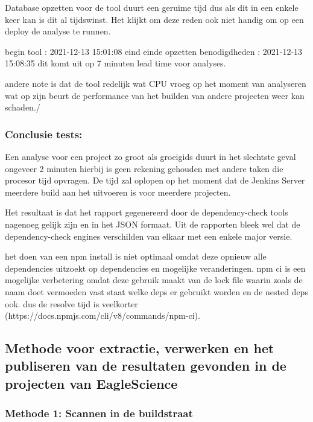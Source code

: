Database opzetten voor de tool duurt een geruime tijd dus als dit in een enkele keer kan is dit al tijdswinst. Het klijkt om deze reden ook niet handig om op een deploy de analyse te runnen.


begin tool : 2021-12-13 15:01:08
eind einde opzetten benodigdheden : 2021-12-13 15:08:35
dit komt uit op 7 minuten lead time voor analyses.

andere note is dat de tool redelijk wat CPU vroeg op het moment van analyseren wat op zijn beurt de performance van het builden van andere projecten weer kan schaden./




\subsubsection{Conclusie tests:}
Een analyse voor een project zo groot als groeigids duurt in het slechtste geval ongeveer 2 minuten hierbij is geen rekening gehouden met andere taken die procesor tijd opvragen. De tijd zal oplopen op het moment dat de Jenkins Server meerdere build aan het uitvoeren is voor meerdere projecten.



Het resultaat is dat het rapport gegenereerd door de dependency-check tools nagenoeg gelijk zijn en in het JSON formaat. Uit de rapporten bleek wel dat de dependency-check engines verschilden van elkaar met een enkele major versie.

het doen van een npm install is niet optimaal omdat deze opnieuw alle dependencies uitzoekt op dependencies en mogelijke veranderingen. npm ci is een mogelijke verbetering omdat deze gebruik maakt van de lock file waarin zoals de naam doet vermoeden vast staat welke deps er gebruikt worden en de nested deps ook. dus de resolve tijd is veelkorter (https://docs.npmjs.com/cli/v8/commands/npm-ci).



\subsection{Methode voor extractie, verwerken en het publiseren van de resultaten gevonden in de projecten van EagleScience}\label{subsec:methodeSOUPES}

\subsubsection{Methode 1: Scannen in de buildstraat}

